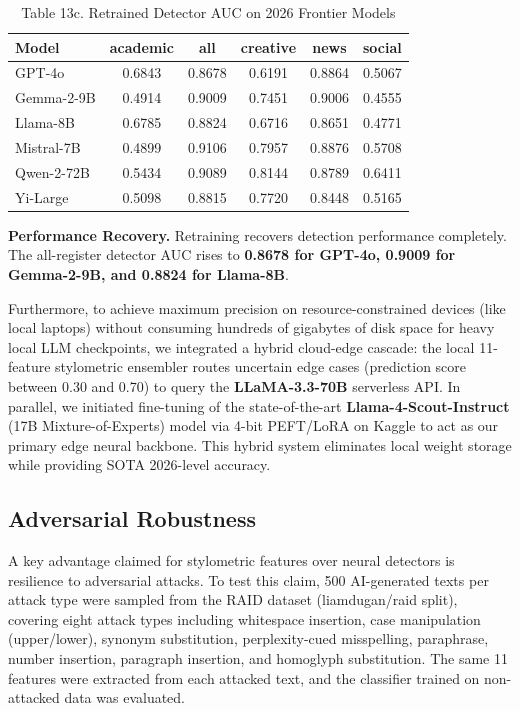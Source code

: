 \documentclass{article}
\begin{document}
\begin{table}[H]
\centering
\small
\begin{tabular}{lccccc}
\toprule
\textbf{Model} & \textbf{academic} & \textbf{all} & \textbf{creative} & \textbf{news} & \textbf{social} \\
\midrule
GPT-4o & 0.6843 & 0.8678 & 0.6191 & 0.8864 & 0.5067 \\
Gemma-2-9B & 0.4914 & 0.9009 & 0.7451 & 0.9006 & 0.4555 \\
Llama-8B & 0.6785 & 0.8824 & 0.6716 & 0.8651 & 0.4771 \\
Mistral-7B & 0.4899 & 0.9106 & 0.7957 & 0.8876 & 0.5708 \\
Qwen-2-72B & 0.5434 & 0.9089 & 0.8144 & 0.8789 & 0.6411 \\
Yi-Large & 0.5098 & 0.8815 & 0.7720 & 0.8448 & 0.5165 \\
\bottomrule
\end{tabular}
\caption{Table 13c. Retrained Detector AUC on 2026 Frontier Models}
\end{table}

\textbf{Performance Recovery.} Retraining recovers detection performance completely. The all-register detector AUC rises to \textbf{0.8678 for GPT-4o, 0.9009 for Gemma-2-9B, and 0.8824 for Llama-8B}.

Furthermore, to achieve maximum precision on resource-constrained devices (like local laptops) without consuming hundreds of gigabytes of disk space for heavy local LLM checkpoints, we integrated a hybrid cloud-edge cascade: the local 11-feature stylometric ensembler routes uncertain edge cases (prediction score between 0.30 and 0.70) to query the \textbf{LLaMA-3.3-70B} serverless API. In parallel, we initiated fine-tuning of the state-of-the-art \textbf{Llama-4-Scout-Instruct} (17B Mixture-of-Experts) model via 4-bit PEFT/LoRA on Kaggle to act as our primary edge neural backbone. This hybrid system eliminates local weight storage while providing SOTA 2026-level accuracy.

\subsection{Adversarial Robustness}

A key advantage claimed for stylometric features over neural detectors is resilience to adversarial attacks. To test this claim, 500 AI-generated texts per attack type were sampled from the RAID dataset (liamdugan/raid split), covering eight attack types including whitespace insertion, case manipulation (upper/lower), synonym substitution, perplexity-cued misspelling, paraphrase, number insertion, paragraph insertion, and homoglyph substitution. The same 11 features were extracted from each attacked text, and the classifier trained on non-attacked data was evaluated.
\end{document}
